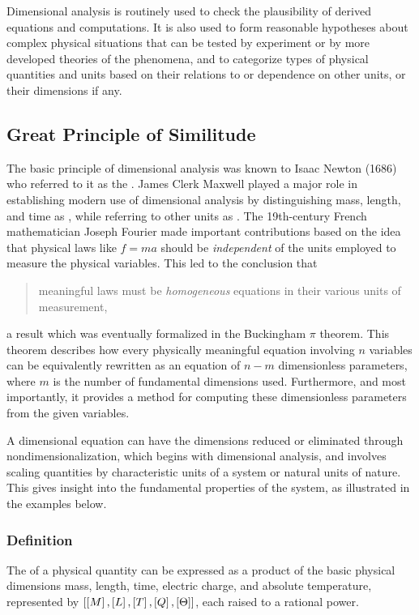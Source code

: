 Dimensional analysis is routinely used to check the plausibility of derived equations and computations. It is also used to form reasonable hypotheses about complex physical situations that can be tested by experiment or by more developed theories of the phenomena, and to categorize types of physical quantities and units based on their relations to or dependence on other units, or their dimensions if any.


\subsection{Great Principle of Similitude}
The basic principle of dimensional analysis was known to Isaac Newton (1686) who referred to it as the . James Clerk Maxwell played a major role in establishing modern use of dimensional analysis by distinguishing mass, length, and time as , while referring to other units as . The 19th-century French mathematician Joseph Fourier made important contributions based on the idea that physical laws like $f = ma$ should be \emph{independent} of the units employed to measure the physical variables. This led to the conclusion that
\begin{quote}
meaningful laws must be \emph{homogeneous} equations in their various units of measurement,
\end{quote}  
a result which was eventually formalized in the Buckingham $\pi$ theorem. This theorem describes how every physically meaningful equation involving $n$ variables can be equivalently rewritten as an equation of $n - m$ dimensionless parameters, where $m$ is the number of fundamental dimensions used. Furthermore, and most importantly, it provides a method for computing these dimensionless parameters from the given variables.

A dimensional equation can have the dimensions reduced or eliminated through nondimensionalization, which begins with dimensional analysis, and involves scaling quantities by characteristic units of a system or natural units of nature. This gives insight into the fundamental properties of the system, as illustrated in the examples below.


\subsubsection{Definition}
The  of a physical quantity can be expressed as a product of the basic physical dimensions mass, length, time, electric charge, and absolute temperature, represented by  $\left[{\left[{M}\right], \left[{L}\right], \left[{T}\right], \left[{Q}\right], \left[{\Theta}\right]}\right]$, each raised to a rational power.

